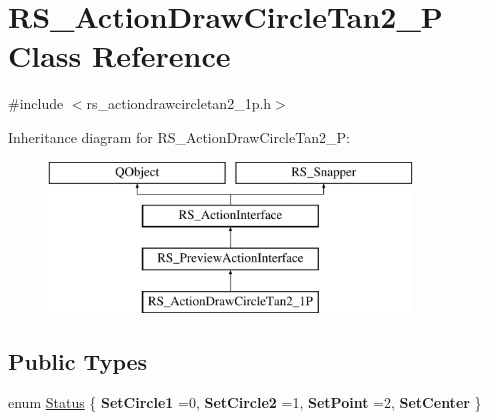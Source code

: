 \hypertarget{classRS__ActionDrawCircleTan2__1P}{\section{R\-S\-\_\-\-Action\-Draw\-Circle\-Tan2\-\_\-P Class Reference}
\label{classRS__ActionDrawCircleTan2__1P}
}


{\ttfamily \#include $<$rs\-\_\-actiondrawcircletan2\-\_\-1p.\-h$>$}

Inheritance diagram for R\-S\-\_\-\-Action\-Draw\-Circle\-Tan2\-\_\-P\-:\begin{figure}[H]
\begin{center}
\leavevmode
\includegraphics[height=4.000000cm]{classRS__ActionDrawCircleTan2__1P}
\end{center}
\end{figure}
\subsection*{Public Types}
\begin{DoxyCompactItemize}
\item 
enum \hyperlink{classRS__ActionDrawCircleTan2__1P_a6ae05b72ebda12ffebfccd4829676c9c}{Status} \{ {\bfseries Set\-Circle1} =0, 
{\bfseries Set\-Circle2} =1, 
{\bfseries Set\-Point} =2, 
{\bfseries Set\-Center}
 \}
\end{DoxyCompactItemize}
